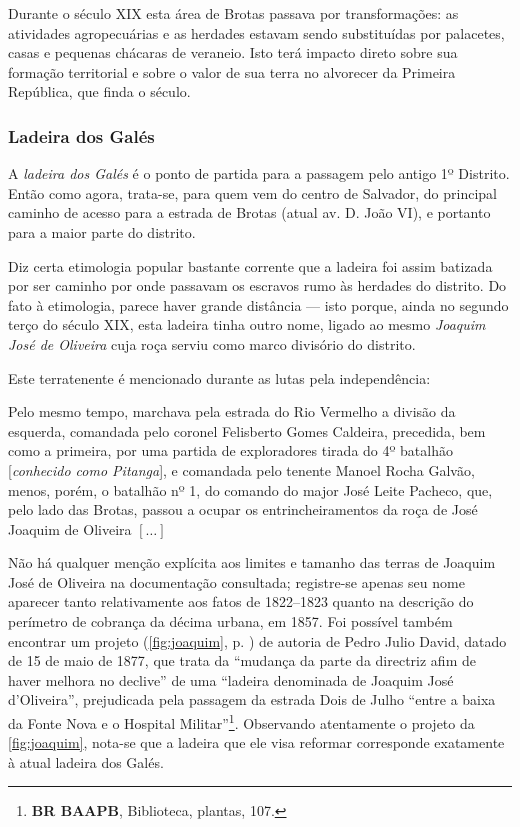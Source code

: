 Durante o século XIX esta área de Brotas passava por transformações: as atividades agropecuárias e as herdades estavam sendo substituídas por palacetes, casas e pequenas chácaras de veraneio. Isto terá impacto direto sobre sua formação territorial e sobre o valor de sua terra no alvorecer da Primeira República, que finda o século.

\subsubsection{Ladeira dos Galés}\label{subsec:josejoaquim}

A \textit{ladeira dos Galés} é o ponto de partida para a passagem pelo antigo 1º Distrito. Então como agora, trata-se, para quem vem do centro de Salvador, do principal caminho de acesso para a estrada de Brotas (atual av. D. João VI), e portanto para a maior parte do distrito.

Diz certa etimologia popular bastante corrente que a ladeira foi assim batizada por ser caminho por onde passavam os escravos rumo às herdades do distrito. Do fato à etimologia, parece haver grande distância --- isto porque, ainda no segundo terço do século XIX, esta ladeira tinha outro nome, ligado ao mesmo \textit{Joaquim José de Oliveira} cuja roça serviu como marco divisório do distrito.

Este terratenente é mencionado durante as lutas pela independência:

\begin{citacao}
Pelo mesmo tempo, marchava pela estrada do Rio Vermelho a divisão da esquerda, comandada pelo coronel Felisberto Gomes Caldeira, precedida, bem como a primeira, por uma partida de exploradores tirada do 4º batalhão [\textit{conhecido como Pitanga}], e comandada pelo tenente Manoel Rocha Galvão, menos, porém, o batalhão nº 1, do comando do major José Leite Pacheco, que, pelo lado das Brotas, passou a ocupar os entrincheiramentos da roça de José Joaquim de Oliveira \([\dots]\) \cite[p.~58]{vieira_memorias_1903}
\end{citacao}

Não há qualquer menção explícita aos limites e tamanho das terras de Joaquim José de Oliveira na documentação consultada; registre-se apenas seu nome aparecer tanto relativamente aos fatos de 1822--1823 quanto na descrição do perímetro de cobrança da décima urbana, em 1857. Foi possível também encontrar um projeto (\autoref{fig:joaquim}, p. \pageref{fig:joaquim}) de autoria de Pedro Julio David, datado de 15 de maio de 1877, que trata da ``mudança da parte da directriz afim de haver melhora no declive'' de uma ``ladeira denominada de Joaquim José d'Oliveira'', prejudicada pela passagem da estrada Dois de Julho ``entre a baixa da Fonte Nova e o Hospital Militar''\footnote{\textbf{BR BAAPB}, Biblioteca, plantas, 107.}. Observando atentamente o projeto da \autoref{fig:joaquim}, nota-se que a ladeira que ele visa reformar corresponde exatamente à atual ladeira dos Galés.

